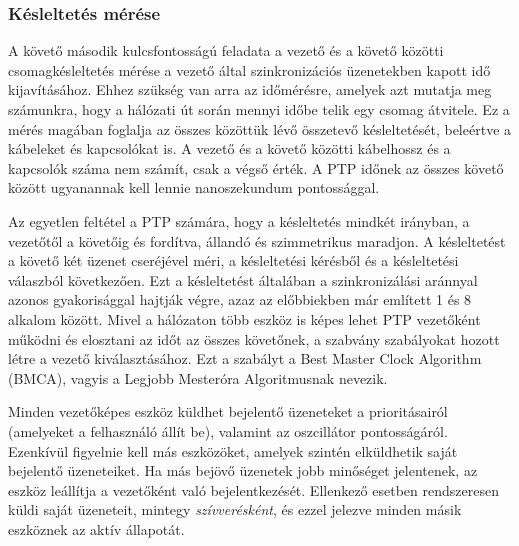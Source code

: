 \subsubsection{Késleltetés mérése}
A követő második kulcsfontosságú feladata a vezető és a követő közötti
csomagkésleltetés mérése a vezető által szinkronizációs üzenetekben kapott
idő kijavításához. Ehhez szükség van arra az időmérésre, amelyek azt mutatja meg számunkra,
hogy a hálózati út során mennyi időbe telik egy csomag átvitele.
Ez a mérés magában foglalja az összes közöttük lévő
összetevő késleltetését, beleértve a kábeleket és kapcsolókat is. 
A vezető és a követő közötti kábelhossz és a kapcsolók száma nem számít, csak a végső érték.
A PTP időnek az összes követő között ugyanannak kell lennie nanoszekundum pontossággal.

Az egyetlen feltétel a PTP számára, hogy a késleltetés mindkét irányban, a vezetőtől a
követőig és fordítva, állandó és szimmetrikus maradjon.
A késleltetést a követő két üzenet cseréjével méri, a késleltetési kérésből és a késleltetési válaszból következően.
Ezt a késleltetést általában a szinkronizálási aránnyal azonos gyakorisággal hajtják végre, 
azaz az előbbiekben már említett 1 és 8 alkalom között.
Mivel a hálózaton több eszköz is képes lehet PTP vezetőként működni és elosztani
az időt az összes követőnek, a szabvány szabályokat hozott létre a vezető
kiválasztásához. Ezt a szabályt a Best Master Clock Algorithm (BMCA), vagyis a
Legjobb Mesteróra Algoritmusnak nevezik. 

Minden vezetőképes eszköz küldhet bejelentő üzeneteket a prioritásairól (amelyeket a felhasználó állít be),
valamint az oszcillátor pontosságáról. Ezenkívül figyelnie kell más eszközöket,
amelyek szintén elküldhetik saját bejelentő üzeneteiket. 
Ha más bejövő üzenetek jobb minőséget jelentenek, az eszköz leállítja a vezetőként való bejelentkezését.
Ellenkező esetben rendszeresen küldi saját üzeneteit, mintegy \textit{szívverésként},
és ezzel jelezve minden másik eszköznek az aktív állapotát. 


